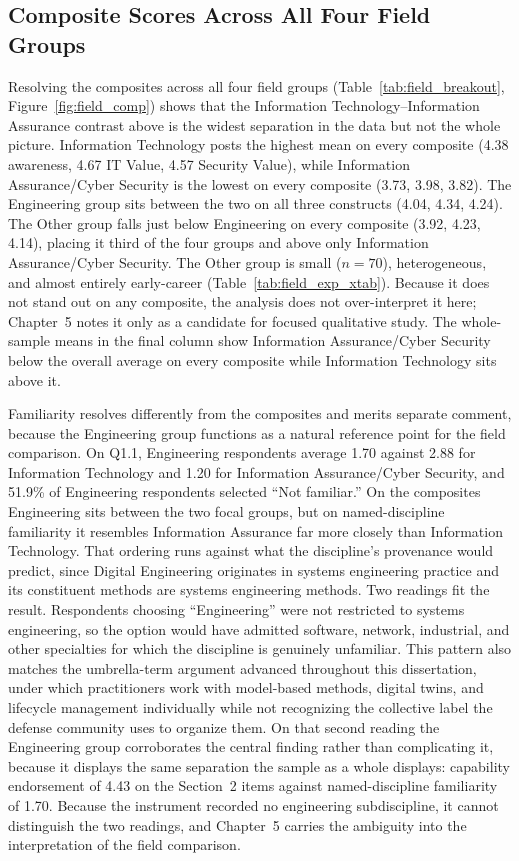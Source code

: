 \subsection{Composite Scores Across All Four Field Groups}

Resolving the composites across all four field groups (Table~\ref{tab:field_breakout}, Figure~\ref{fig:field_comp}) shows that the Information Technology--Information Assurance contrast above is the widest separation in the data but not the whole picture. Information Technology posts the highest mean on every composite (4.38 awareness, 4.67 IT Value, 4.57 Security Value), while Information Assurance/Cyber Security is the lowest on every composite (3.73, 3.98, 3.82). The Engineering group sits between the two on all three constructs (4.04, 4.34, 4.24). The Other group falls just below Engineering on every composite (3.92, 4.23, 4.14), placing it third of the four groups and above only Information Assurance/Cyber Security. The Other group is small ($n=70$), heterogeneous, and almost entirely early-career (Table~\ref{tab:field_exp_xtab}). Because it does not stand out on any composite, the analysis does not over-interpret it here; Chapter~5 notes it only as a candidate for focused qualitative study. The whole-sample means in the final column show Information Assurance/Cyber Security below the overall average on every composite while Information Technology sits above it.

Familiarity resolves differently from the composites and merits separate comment, because the Engineering group functions as a natural reference point for the field comparison. On Q1.1, Engineering respondents average 1.70 against 2.88 for Information Technology and 1.20 for Information Assurance/Cyber Security, and 51.9\% of Engineering respondents selected ``Not familiar.'' On the composites Engineering sits between the two focal groups, but on named-discipline familiarity it resembles Information Assurance far more closely than Information Technology. That ordering runs against what the discipline's provenance would predict, since Digital Engineering originates in systems engineering practice and its constituent methods are systems engineering methods. Two readings fit the result. Respondents choosing ``Engineering'' were not restricted to systems engineering, so the option would have admitted software, network, industrial, and other specialties for which the discipline is genuinely unfamiliar. This pattern also matches the umbrella-term argument advanced throughout this dissertation, under which practitioners work with model-based methods, digital twins, and lifecycle management individually while not recognizing the collective label the defense community uses to organize them. On that second reading the Engineering group corroborates the central finding rather than complicating it, because it displays the same separation the sample as a whole displays: capability endorsement of 4.43 on the Section~2 items against named-discipline familiarity of 1.70. Because the instrument recorded no engineering subdiscipline, it cannot distinguish the two readings, and Chapter~5 carries the ambiguity into the interpretation of the field comparison.


